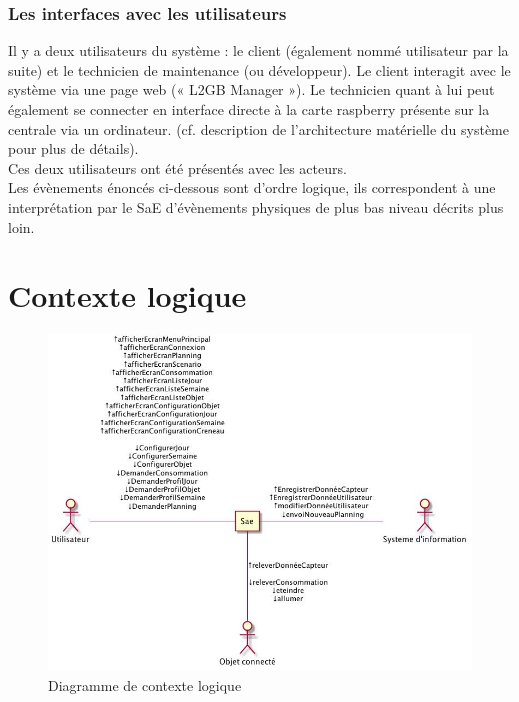 \documentclass[10pt,a4paper]{report}
\begin{document}
			\subsection{Les interfaces avec les utilisateurs}
			
Il y a deux utilisateurs du système : le client (également nommé utilisateur par la suite) et le technicien de maintenance (ou développeur). Le client interagit avec le système via une page web (« L2GB Manager »). Le technicien quant à lui peut également se connecter en interface directe à la carte raspberry présente sur la centrale via un ordinateur. (cf. description de l’architecture matérielle du système pour plus de détails).\\

Ces deux utilisateurs ont été présentés avec les acteurs.\\

Les évènements énoncés ci-dessous sont d’ordre logique, ils correspondent à une interprétation par le SaE d’évènements physiques de plus bas niveau décrits plus loin.			


	\chapter{Contexte logique}
	
\begin{figure}[H]
	\centering
	\includegraphics[scale=0.55]{diagContexteLogique}
	\caption{Diagramme de contexte logique}
	\label{diagContexteLogique}
\end{figure}
\end{document}
